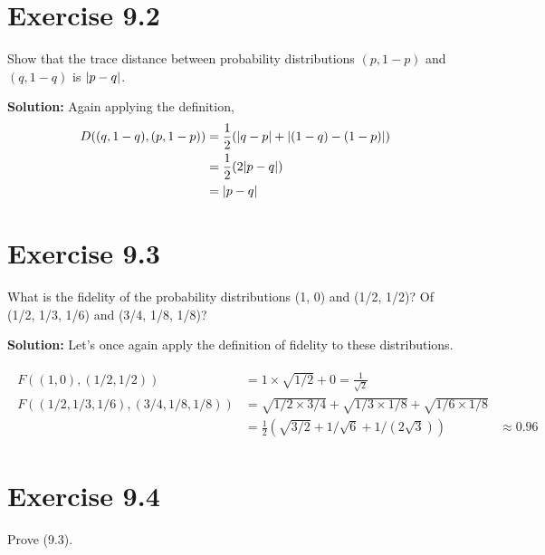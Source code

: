 \documentclass{book}
\begin{document}
\section*{Exercise 9.2}
    Show that the trace distance between probability distributions $(p, 1 - p)$ and $(q, 1 - q)$ is $\abs{p - q}$.
    
    \textbf{Solution:} Again applying the definition,
    \begin{align}
    \begin{aligned}
        D((q,1-q), (p,1-p)) &= \frac{1}{2}(\abs{q-p} + \abs{(1-q)-(1-p)}) \\
        &= \frac{1}{2} (2 \abs{p-q}) \\
        &= \abs{p-q}
    \end{aligned}
    \end{align}

\section*{Exercise 9.3}
    What is the fidelity of the probability distributions (1, 0) and (1/2, 1/2)? Of (1/2, 1/3, 1/6) and (3/4, 1/8, 1/8)?
    
    \textbf{Solution:} Let's once again apply the definition of fidelity to these distributions.
    
    \begin{align}
    \begin{aligned}
        F((1,0),(1/2,1/2)) &= 1\times \sqrt{1/2} + 0 = \frac{1}{\sqrt{2}} \\
        F((1/2,1/3,1/6),(3/4,1/8,1/8)) &= \sqrt{1/2\times 3/4} + \sqrt{1/3\times 1/8}+\sqrt{1/6\times 1/8} \\
        &= \frac{1}{2}(\sqrt{3/2} + 1/\sqrt{6}+1/(2\sqrt{3}))
        &\approx 0.96
    \end{aligned}
    \end{align}

\section*{Exercise 9.4}
    Prove (9.3).
    
\end{document}
